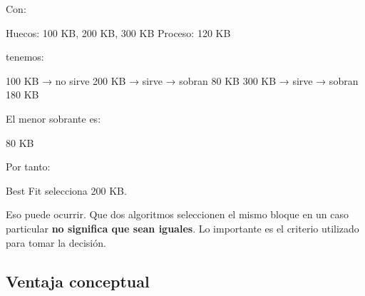 \documentclass[
  spanish,
  letterpaper,
]{scrbook}
\newenvironment{Shaded}{\begin{snugshade}}{\end{snugshade}}
\newcommand{\NormalTok}[1]{\textcolor[rgb]{0.00,0.23,0.31}{#1}}
\begin{document}
Con:

\begin{Shaded}
\begin{Highlighting}[]
\NormalTok{Huecos: 100 KB, 200 KB, 300 KB}
\NormalTok{Proceso: 120 KB}
\end{Highlighting}
\end{Shaded}

tenemos:

\begin{Shaded}
\begin{Highlighting}[]
\NormalTok{100 KB → no sirve}
\NormalTok{200 KB → sirve → sobran 80 KB}
\NormalTok{300 KB → sirve → sobran 180 KB}
\end{Highlighting}
\end{Shaded}

El menor sobrante es:

\begin{Shaded}
\begin{Highlighting}[]
\NormalTok{80 KB}
\end{Highlighting}
\end{Shaded}

Por tanto:

\begin{Shaded}
\begin{Highlighting}[]
\NormalTok{Best Fit selecciona 200 KB.}
\end{Highlighting}
\end{Shaded}

\begin{tcolorbox}[enhanced jigsaw, arc=.35mm, bottomrule=.15mm, bottomtitle=1mm, breakable, colback=white, colbacktitle=quarto-callout-note-color!10!white, colframe=quarto-callout-note-color-frame, coltitle=black, left=2mm, leftrule=.75mm, opacityback=0, opacitybacktitle=0.6, rightrule=.15mm, title=\textcolor{quarto-callout-note-color}{\faInfo}\hspace{0.5em}{¡Aquí First Fit y Best Fit dieron el mismo resultado!}, titlerule=0mm, toprule=.15mm, toptitle=1mm]

Eso puede ocurrir. Que dos algoritmos seleccionen el mismo bloque en un
caso particular \textbf{no significa que sean iguales}. Lo importante es
el criterio utilizado para tomar la decisión.

\end{tcolorbox}

\subsection{Ventaja conceptual}\label{ventaja-conceptual}
\end{document}
